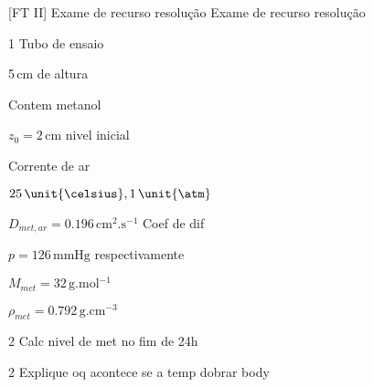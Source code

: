 \documentclass[\mainfilename]{subfiles}
\begin{document}

[FT II]
{Exame de recurso resolução} %
{Exame de recurso resolução} %

\begin{questionBox}1{ %
    Tubo de ensaio
} %
    \begin{itemize}
        \begin{multicols}{2}
            \item 5\,\unit{\centi\metre} de altura
            \item Contem metanol
            \item \(z_0=2\,\unit{\centi\metre}\) nivel inicial
            \item Corrente de ar
            \item \(25\,\unit{\celsius},1\,\unit{\atm}\)
            \item \(D_{met,ar}=0.196\,\unit{\centi\metre^2.\second^{-1}}\) Coef de dif
            \item \(p=126\,\unit{\mmHg}\) respectivamente
            \item \(M_{met}=32\,\unit{\gram.\mole^{-1}}\)
            \item \(\rho_{met}=0.792\,\unit{\gram.\centi\metre^{-3}}\)
        \end{multicols}
    \end{itemize}

    \begin{questionBox}2{ %
        Calc nivel de met no fim de 24h
    } %
        
    \end{questionBox}

    \begin{questionBox}2{ %
        Explique oq acontece se a temp dobrar
    } %
        body
    \end{questionBox}
\end{questionBox}
\end{document}
